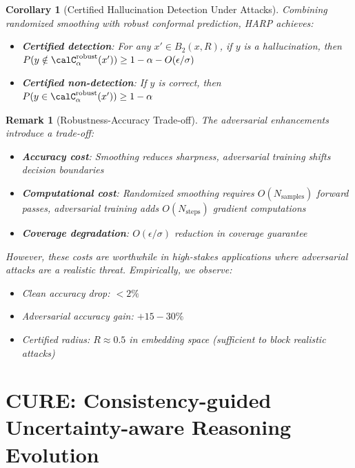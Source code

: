\documentclass[11pt,a4paper]{article}
\newtheorem{corollary}[theorem]{Corollary}
\newtheorem{remark}[theorem]{Remark}
\begin{document}
\begin{corollary}[Certified Hallucination Detection Under Attacks]
Combining randomized smoothing with robust conformal prediction, HARP achieves:
\begin{itemize}
    \item \textbf{Certified detection}: For any $x' \in B_2(x, R)$, if $y$ is a hallucination, then $P(y \notin \calC_\alpha^{\text{robust}}(x')) \geq 1 - \alpha - O(\epsilon/\sigma)$
    \item \textbf{Certified non-detection}: If $y$ is correct, then $P(y \in \calC_\alpha^{\text{robust}}(x')) \geq 1 - \alpha$
\end{itemize}
\end{corollary}

\begin{remark}[Robustness-Accuracy Trade-off]
The adversarial enhancements introduce a trade-off:
\begin{itemize}
    \item \textbf{Accuracy cost}: Smoothing reduces sharpness, adversarial training shifts decision boundaries
    \item \textbf{Computational cost}: Randomized smoothing requires $O(N_{\text{samples}})$ forward passes, adversarial training adds $O(N_{\text{steps}})$ gradient computations
    \item \textbf{Coverage degradation}: $O(\epsilon/\sigma)$ reduction in coverage guarantee
\end{itemize}

However, these costs are worthwhile in high-stakes applications where adversarial attacks are a realistic threat. Empirically, we observe:
\begin{itemize}
    \item Clean accuracy drop: $< 2\%$
    \item Adversarial accuracy gain: $+15-30\%$
    \item Certified radius: $R \approx 0.5$ in embedding space (sufficient to block realistic attacks)
\end{itemize}
\end{remark}

\section{CURE: Consistency-guided Uncertainty-aware Reasoning Evolution}
\end{document}
